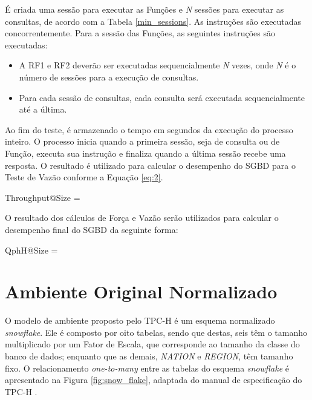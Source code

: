 É criada uma sessão para executar as Funções e \textit{N} sessões para executar as consultas, de acordo com a Tabela \ref{min_sessions}. As instruções são executadas concorrentemente. Para a sessão das Funções, as seguintes instruções são executadas:

\begin{itemize}
	\item A RF1 e RF2 deverão ser executadas sequencialmente \textit{N} vezes, onde \textit{N} é o número de sessões para a execução de consultas.
	\item Para cada sessão de consultas, cada consulta será executada sequencialmente até a última.
\end{itemize}

Ao fim do teste, é armazenado o tempo em segundos da execução do processo inteiro. O processo inicia quando a primeira sessão, seja de consulta ou de Função, executa sua instrução e finaliza quando a última sessão recebe uma resposta. O resultado é utilizado para calcular o desempenho do SGBD para o Teste de Vazão conforme a Equação \ref{eq:2}.

\begin{myequation}%
\label{eq:2}
{\scriptstyle Throughput@Size} =  %
\end{myequation}
%

O resultado dos cálculos de Força e Vazão serão utilizados para calcular o desempenho final do SGBD da seguinte forma:

\begin{myequation}%
\label{eq:3}
{ \scriptstyle QphH@Size =  } %
\end{myequation}
%

\section{Ambiente Original Normalizado}
\label{ambiente_1}

O modelo de ambiente proposto pelo TPC-H é um esquema normalizado \textit{snowflake}. Ele é composto por oito tabelas, sendo que destas, seis têm o tamanho multiplicado por um Fator de Escala, que corresponde ao tamanho da classe do banco de dados; enquanto que as demais, \textit{NATION} e \textit{REGION}, têm tamanho fixo. O relacionamento \textit{one-to-many} entre as tabelas do esquema \textit{snowflake} é apresentado na Figura \ref{fig:snow_flake}, adaptada do manual de especificação do TPC-H \cite{tpc2017specs}.

